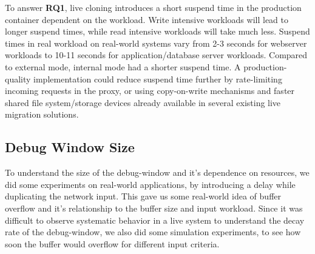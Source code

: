 


\begin{tcolorbox}
	To answer \textbf{RQ1}, live cloning introduces a short suspend time in the production container dependent on the workload. 
	Write intensive workloads will lead to longer suspend times, while read intensive workloads will take much less. 
	Suspend times in real workload on real-world systems vary from 2-3 seconds for webserver workloads to 10-11 seconds for application/database server workloads. 
	Compared to external mode, internal mode had a shorter suspend time. 
	A production-quality implementation could reduce suspend time further by rate-limiting incoming requests in the proxy, or using copy-on-write mechanisms and faster shared file system/storage devices already available in several existing live migration solutions.
\end{tcolorbox}

\subsection{Debug Window Size}
\label{sec:parikshanTimewindowPerformance}

To understand the size of the debug-window and it's dependence on resources, we did some experiments on real-world applications, by introducing a delay while duplicating the network input.
This gave us some real-world idea of buffer overflow and it's relationship to the buffer size and input workload.
Since it was difficult to observe systematic behavior in a live system to understand the decay rate of the debug-window, we also did some simulation experiments, to see how soon the buffer would overflow for different input criteria.



